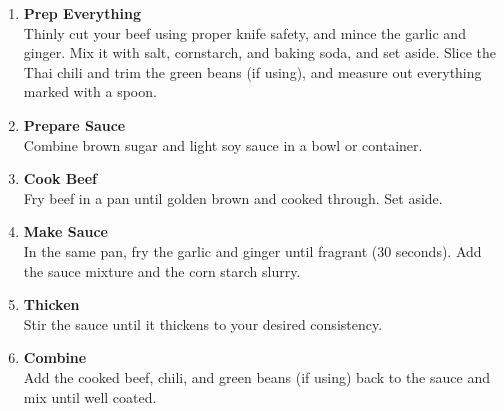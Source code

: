 \begin{enumerate}

      \item \textbf{Prep Everything} \\
            Thinly cut your beef using proper knife safety, and mince the garlic and ginger. Mix it with salt, cornstarch, and baking soda, and set aside. Slice the Thai chili and trim the green beans (if using), and measure out everything marked with a spoon.

      \item \textbf{Prepare Sauce} \\
            Combine brown sugar and light soy sauce in a bowl or container.

      \item \textbf{Cook Beef} \\
            Fry beef in a pan until golden brown and cooked through. Set aside.

      \item \textbf{Make Sauce} \\
            In the same pan, fry the garlic and ginger until fragrant (30 seconds). Add the sauce mixture and the corn starch slurry.

      \item \textbf{Thicken} \\
            Stir the sauce until it thickens to your desired consistency.

      \item \textbf{Combine} \\
            Add the cooked beef, chili, and green beans (if using) back to the sauce and mix until well coated.

\end{enumerate}


